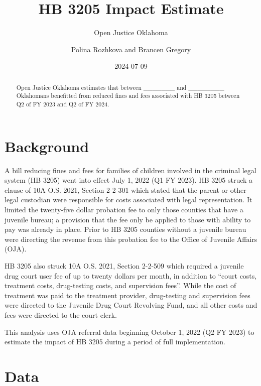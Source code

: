 \documentclass[
  letterpaper,
  DIV=11,
  numbers=noendperiod]{scrartcl}
\title{HB 3205 Impact Estimate}
\subtitle{Open Justice Oklahoma}
\author{Polina Rozhkova and Brancen Gregory}
\date{2024-07-09}
\begin{document}
\maketitle
\begin{abstract}
Open Justice Oklahoma estimates that between \_\_\_\_\_\_\_ and
\_\_\_\_\_\_\_\_ Oklahomans benefitted from reduced fines and fees
associated with HB 3205 between Q2 of FY 2023 and Q2 of FY 2024.
\end{abstract}
\ifdefined\Shaded\renewenvironment{Shaded}{\begin{tcolorbox}[borderline west={3pt}{0pt}{shadecolor}, sharp corners, boxrule=0pt, interior hidden, enhanced, frame hidden, breakable]}{\end{tcolorbox}}\fi

\hypertarget{background}{%
\section{Background}\label{background}}

A bill reducing fines and fees for families of children involved in the
criminal legal system (HB 3205) went into effect July 1, 2022 (Q1 FY
2023). HB 3205 struck a clause of 10A O.S. 2021, Section 2-2-301 which
stated that the parent or other legal custodian were responsible for
costs associated with legal representation. It limited the twenty-five
dollar probation fee to only those counties that have a juvenile bureau;
a provision that the fee only be applied to those with ability to pay
was already in place. Prior to HB 3205 counties without a juvenile
bureau were directing the revenue from this probation fee to the Office
of Juvenile Affairs (OJA).

HB 3205 also struck 10A O.S. 2021, Section 2-2-509 which required a
juvenile drug court user fee of up to twenty dollars per month, in
addition to ``court costs, treatment costs, drug-testing costs, and
supervision fees''. While the cost of treatment was paid to the
treatment provider, drug-testing and supervision fees were directed to
the Juvenile Drug Court Revolving Fund, and all other costs and fees
were directed to the court clerk.

This analysis uses OJA referral data beginning October 1, 2022 (Q2 FY
2023) to estimate the impact of HB 3205 during a period of full
implementation.

\hypertarget{data}{%
\section{Data}\label{data}}
\end{document}
